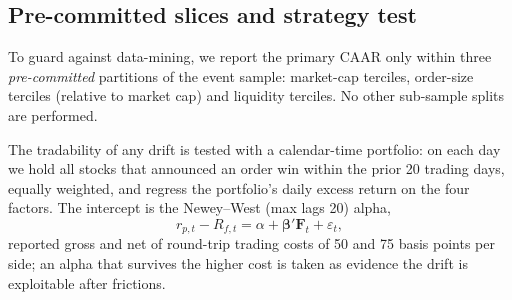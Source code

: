 \subsection{Pre-committed slices and strategy test}
\label{sec:slices}

To guard against data-mining, we report the primary CAAR only within three
\emph{pre-committed} partitions of the event sample: market-cap terciles,
order-size terciles (relative to market cap) and liquidity terciles. No
other sub-sample splits are performed.

The tradability of any drift is tested with a calendar-time portfolio: on
each day we hold all stocks that announced an order win within the prior 20
trading days, equally weighted, and regress the portfolio's daily excess
return on the four factors. The intercept is the Newey--West (max lags
20) alpha,
\begin{equation}
  r_{p,t} - R_{f,t} = \alpha + \bm\beta'\mathbf{F}_t + \varepsilon_{t},
\end{equation}
reported gross and net of round-trip trading costs of 50 and 75 basis
points per side; an alpha that survives the higher cost is taken as
evidence the drift is exploitable after frictions.
